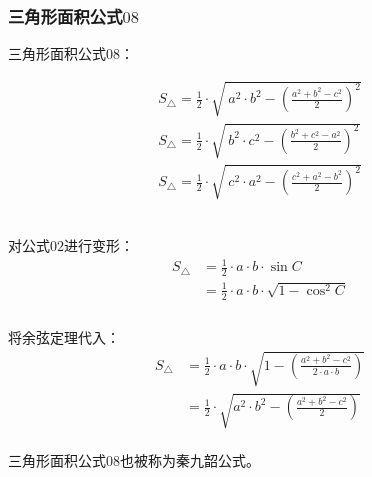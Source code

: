 \documentclass[UTF8]{ctexart}
\begin{document}
\subsubsection{三角形面积公式$08$}
    三角形面积公式$08$：
    \begin{large}
        \begin{align*}
            S_{\triangle}=\frac{1}{2}\cdot\sqrt{~a^2\cdot b^2-\left(\frac{a^2+b^2-c^2}{2}\right)^2}\\[4mm]
            S_{\triangle}=\frac{1}{2}\cdot\sqrt{~b^2\cdot c^2-\left(\frac{b^2+c^2-a^2}{2}\right)^2}\\[4mm]
            S_{\triangle}=\frac{1}{2}\cdot\sqrt{~c^2\cdot a^2-\left(\frac{c^2+a^2-b^2}{2}\right)^2}
        \end{align*}
    \end{large}\\
    对公式$02$进行变形：
    \setcounter{equation}{0}
    \begin{align}
        S_{\triangle}
        &=\frac{1}{2}\cdot a\cdot b\cdot\sin{C}\\[3mm]
        &=\frac{1}{2}\cdot a\cdot b\cdot\sqrt{1-\cos^2{C}}\\[3mm]
    \end{align}\\
    将余弦定理代入：
    \begin{align}
        S_{\triangle}
        &=\frac{1}{2}\cdot a\cdot b\cdot\sqrt{1-\left(\frac{a^2+b^2-c^2}{2\cdot a\cdot b}\right)}\\[3mm]
        &=\frac{1}{2}\cdot\sqrt{a^2\cdot b^2 -\left(\frac{a^2+b^2-c^2}{2}\right)}
    \end{align}\\
    三角形面积公式$08$也被称为秦九韶公式。

\newpage
\end{document}
